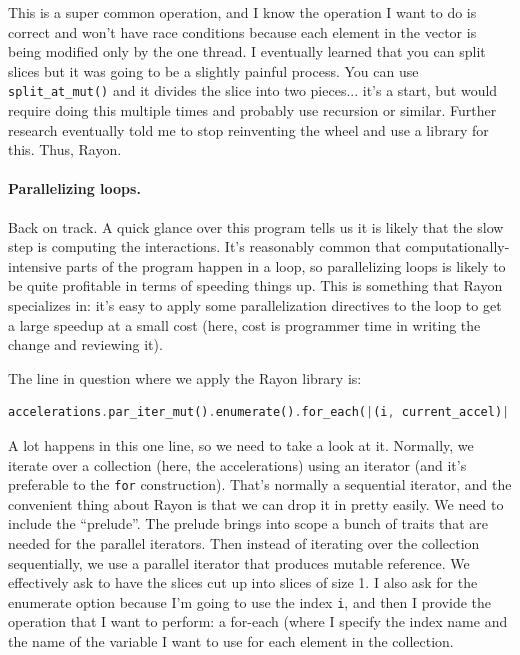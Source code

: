 \documentclass[a4paper]{report}
\begin{document}
 This is a super common operation, and I know the operation I want to do is correct and won't have race conditions because each element in the vector is being modified only by the one thread. I eventually learned that you can split slices but it was going to be a slightly painful process. You can use \texttt{split\_at\_mut()} and it divides the slice into two pieces... it's a start, but would require doing this multiple times and probably use recursion or similar. Further research eventually told me to stop reinventing the wheel and use a library for this. Thus, Rayon.

\paragraph{Parallelizing loops.} Back on track. A quick glance over this program tells us it is likely that the slow step is computing the interactions. It's reasonably common that computationally-intensive parts of the program happen in a loop, so parallelizing loops is likely to be quite profitable in terms of speeding things up. This is something that Rayon specializes in: it's easy to apply some parallelization directives to the loop to get a large speedup at a small cost (here, cost is programmer time in writing the change and reviewing it).

The line in question where we apply the Rayon library is:
\begin{lstlisting}[language=Rust]
accelerations.par_iter_mut().enumerate().for_each(|(i, current_accel)| {
\end{lstlisting}

A lot happens in this one line, so we need to take a look at it. Normally, we iterate over a collection (here, the accelerations) using an iterator (and it's preferable to the \texttt{for} construction). That's normally a sequential iterator, and the convenient thing about Rayon is that we can drop it in pretty easily. We need to include the ``prelude''. The prelude brings into scope a bunch of traits that are needed for the parallel iterators. Then instead of iterating over the collection sequentially, we use a parallel iterator that produces mutable reference. We effectively ask to have the slices cut up into slices of size 1. I also ask for the enumerate option because I'm going to use the index \texttt{i}, and then I provide the operation that I want to perform: a for-each (where I specify the index name and the name of the variable I want to use for each element in the collection. 
\end{document}
